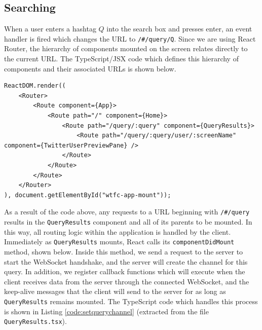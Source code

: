 \documentclass{l4proj}
\newcommand{\code}[1]{\texttt{#1}}
\begin{document}
        \subsection{Searching}
        When a user enters a hashtag $Q$ into the search box and presses enter, an event handler is fired which changes the URL to \code{/\#/query/Q}. Since we are using React Router, the hierarchy of components mounted on the screen relates directly to the current URL. The TypeScript/JSX code which defines this hierarchy of components and their associated URLs is shown below.
        
\begin{lstlisting}[caption=Definition of the hierarchy of React component and how they map to the URL.,label=routerdef]
ReactDOM.render((
    <Router>
        <Route component={App}>
            <Route path="/" component={Home}>
                <Route path="/query/:query" component={QueryResults}>
                    <Route path="/query/:query/user/:screenName" component={TwitterUserPreviewPane} />
                </Route>
            </Route>
        </Route>
    </Router>
), document.getElementById("wtfc-app-mount"));
\end{lstlisting}
         
As a result of the code above, any requests to a URL beginning with \code{/\#/query} results in the \code{QueryResults} component and all of its parents to be mounted. In this way, all routing logic within the application is handled by the client. Immediately as \code{QueryResults} mounts, React calls its \code{componentDidMount} method, shown below. Inside this method, we send a request to the server to start the WebSocket handshake, and the server will create the channel for this query. In addition, we register callback functions which will execute when the client receives data from the server through the connected WebSocket, and the keep-alive messages that the client will send to the server for as long as \code{QueryResults} remains mounted. The TypeScript code which handles this process is shown in Listing \ref{code:setquerychannel} (extracted from the file \code{QueryResults.tsx}).
\end{document}
